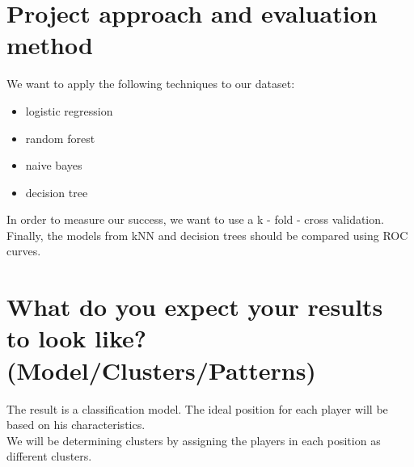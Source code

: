 \documentclass[runningheads]{llncs}
\begin{document}


\section{Project approach and evaluation method}
We want to apply the following techniques to our dataset:
\begin{itemize}
\item logistic regression
\item random forest 
\item naive bayes
\item decision tree
\end{itemize}


In order to measure our success, we want to use a k - fold - cross validation.\\
Finally, the models from kNN and decision trees should be compared using ROC curves.




\section{What do you expect your results to look like? (Model/Clusters/Patterns)}
The result is a classification model. The ideal position for each player will be based on his characteristics.\\
We will be determining clusters by assigning the players in each position as different clusters.






%
%
% 
% 
%
%
%
%
%
\end{document}
